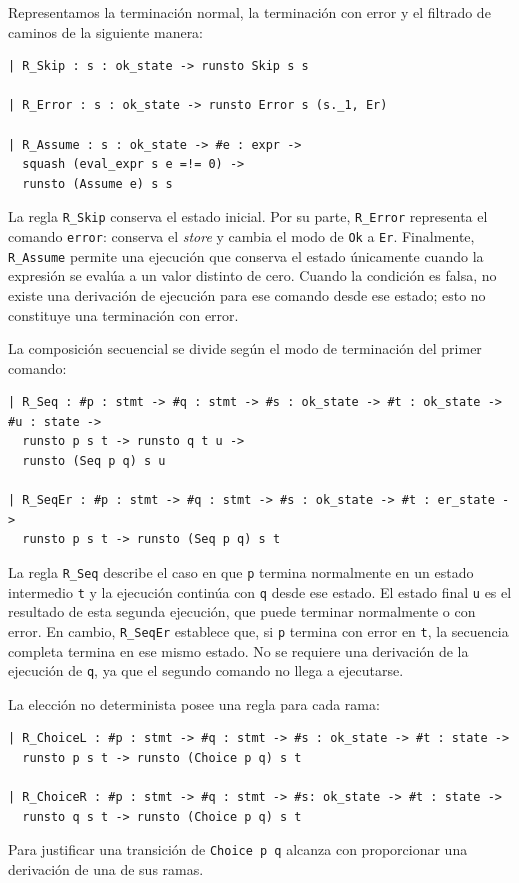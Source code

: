 \documentclass[a4paper,	11pt]{report}
\begin{document}
Representamos la terminación normal,
la terminación con error y el filtrado de caminos de la siguiente manera:

\begin{lstlisting}
| R_Skip : s : ok_state -> runsto Skip s s

| R_Error : s : ok_state -> runsto Error s (s._1, Er)

| R_Assume : s : ok_state -> #e : expr ->
  squash (eval_expr s e =!= 0) ->
  runsto (Assume e) s s
\end{lstlisting}

La regla \lstinline|R_Skip| conserva el estado inicial.
Por su parte,
\lstinline|R_Error| representa el comando \lstinline|error|:
conserva el \emph{store} y cambia el modo de \lstinline|Ok| a \lstinline|Er|.
Finalmente,
\lstinline|R_Assume| permite una ejecución que conserva el estado únicamente
cuando la expresión se evalúa a un valor distinto de cero.
Cuando la condición es falsa,
no existe una derivación de ejecución para ese comando desde ese estado;
esto no constituye una terminación con error.

La composición secuencial se divide según el modo de terminación del primer comando:

\begin{lstlisting}
| R_Seq : #p : stmt -> #q : stmt -> #s : ok_state -> #t : ok_state -> #u : state ->
  runsto p s t -> runsto q t u ->
  runsto (Seq p q) s u

| R_SeqEr : #p : stmt -> #q : stmt -> #s : ok_state -> #t : er_state ->
  runsto p s t -> runsto (Seq p q) s t
\end{lstlisting}


La regla \lstinline|R_Seq| describe el caso en que \lstinline|p| termina normalmente en un estado intermedio \lstinline|t|
y la ejecución continúa con \lstinline|q| desde ese estado.
El estado final \lstinline|u| es el resultado de esta segunda ejecución,
que puede terminar normalmente o con error.
En cambio,
\lstinline|R_SeqEr| establece que,
si \lstinline|p| termina con error en \lstinline|t|,
la secuencia completa termina en ese mismo estado.
No se requiere una derivación de la ejecución de \lstinline|q|,
ya que el segundo comando no llega a ejecutarse.

La elección no determinista posee una regla para cada rama:

\begin{lstlisting}
| R_ChoiceL : #p : stmt -> #q : stmt -> #s : ok_state -> #t : state ->
  runsto p s t -> runsto (Choice p q) s t

| R_ChoiceR : #p : stmt -> #q : stmt -> #s: ok_state -> #t : state ->
  runsto q s t -> runsto (Choice p q) s t
\end{lstlisting}
Para justificar una transición de \lstinline|Choice p q| alcanza con proporcionar una derivación de una de sus ramas.
\end{document}
